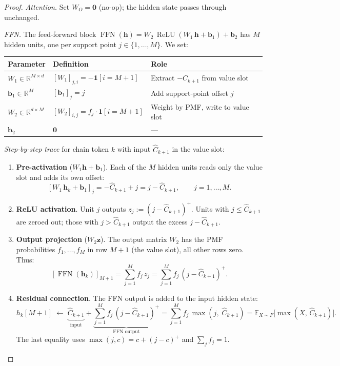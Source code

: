 \documentclass{article}
\begin{document}
\begin{proof}
\emph{Attention.} Set $W_O = \mathbf{0}$ (no-op); the hidden state passes through unchanged.

\emph{FFN.} The feed-forward block $\operatorname{FFN}(\mathbf{h}) = W_2\,\operatorname{ReLU}(W_1\,\mathbf{h} + \mathbf{b}_1) + \mathbf{b}_2$ has $M$ hidden units, one per support point $j \in \{1,\ldots,M\}$. We set:

\begin{center}
\small
\renewcommand{\arraystretch}{1.3}
\begin{tabular}{lll}
\toprule
\textbf{Parameter} & \textbf{Definition} & \textbf{Role} \\
\midrule
$W_1 \in \mathbb{R}^{M \times d}$ & $[W_1]_{j,i} = -\mathbf{1}[i = M{+}1]$ & Extract $-C_{k+1}$ from value slot \\
$\mathbf{b}_1 \in \mathbb{R}^{M}$ & $[\mathbf{b}_1]_j = j$ & Add support-point offset $j$ \\
$W_2 \in \mathbb{R}^{d \times M}$ & $[W_2]_{i,j} = f_j \cdot \mathbf{1}[i = M{+}1]$ & Weight by PMF, write to value slot \\
$\mathbf{b}_2$ & $\mathbf{0}$ & --- \\
\bottomrule
\end{tabular}
\end{center}

\emph{Step-by-step trace} for chain token $k$ with input $\hat C_{k+1}$ in the value slot:

\begin{enumerate}
\item \textbf{Pre-activation} ($W_1 \mathbf{h} + \mathbf{b}_1$). Each of the $M$ hidden units reads only the value slot and adds its own offset:
\[
[W_1\,\mathbf{h}_k + \mathbf{b}_1]_j = -\hat C_{k+1} + j = j - \hat C_{k+1}, \qquad j = 1,\ldots,M.
\]
\item \textbf{ReLU activation}. Unit $j$ outputs $z_j := (j - \hat C_{k+1})^{+}$. Units with $j \le \hat C_{k+1}$ are zeroed out; those with $j > \hat C_{k+1}$ output the excess $j - \hat C_{k+1}$.

\item \textbf{Output projection} ($W_2 \mathbf{z}$). The output matrix $W_2$ has the PMF probabilities $f_1,\ldots,f_M$ in row $M{+}1$ (the value slot), all other rows zero. Thus:
\[
[\operatorname{FFN}(\mathbf{h}_k)]_{M+1} = \sum_{j=1}^{M} f_j\,z_j = \sum_{j=1}^{M} f_j\,(j - \hat C_{k+1})^{+}.
\]

\item \textbf{Residual connection}. The FFN output is added to the input hidden state:
\[
h_k[M{+}1] \;\leftarrow\; \underbrace{\hat C_{k+1}}_{\text{input}} + \underbrace{\sum_{j=1}^{M} f_j\,(j - \hat C_{k+1})^{+}}_{\text{FFN output}}
  = \sum_{j=1}^{M} f_j\,\max(j,\;\hat C_{k+1})
  = \mathbb{E}_{X \sim F}\!\big[\max(X,\,\hat C_{k+1})\big].
\]
The last equality uses $\max(j, c) = c + (j-c)^+$ and $\sum_j f_j = 1$.
\end{enumerate}


\end{proof}
\end{document}

